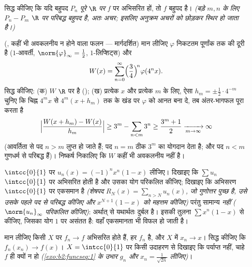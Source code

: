 \begin{exercise}[$\star\star$]\label{exo:b2:funcseq:8}
सिद्ध कीजिए कि यदि बहुपद $P_n$ \emph{पूरे $\R$ पर} $f$ पर 
अभिसरित हों, तो $f$ बहुपद है। \emph{(बड़े $m, n$ के लिए $P_n - P_m$ $\R$ पर परिबद्ध
बहुपद है, अतः अचर; इसलिए अनुक्रम अचरों को छोड़कर स्थिर हो जाता है।)}
\end{exercise}

\begin{exercise}[$\star\star\star$]\label{exo:b2:funcseq:9}
(, कहीं भी अवकलनीय न होने वाला फलन --- मार्गदर्शित) मान लीजिए $\varphi$
निकटतम पूर्णांक तक की दूरी है ($1$-आवर्ती, $\norm{\varphi}_\infty = \frac12$, $1$-लिप्शिट्स) और
\[
W(x) = \sum_{n=0}^{\infty} \Bigl(\frac{3}{4}\Bigr)^{\!n}
\varphi(4^n x) .
\]
सिद्ध कीजिए: (क) $W$ $\R$ पर  है (); (ख) प्रत्येक $x$
और प्रत्येक $m$ के लिए, ऐसा $h_m = \pm\frac12\cdot 4^{-m}$ चुनिए कि चिह्न $4^m x$ से $4^m(x + h_m)$ तक के खंड पर
$\varphi$ को आनत बना दे, तब अंतर-भागफल पूरा करता है
\[
\Bigl|\frac{W(x + h_m) - W(x)}{h_m}\Bigr| \geq 3^m -
\sum_{n<m} 3^n \geq \frac{3^m + 1}{2} \xrightarrow[m\to\infty]{}
\infty
\]
(आवर्तिता से पद $n > m$ लुप्त हो जाते हैं; पद $n = m$ ठीक $3^m$ का योगदान देता
है; और पद $n < m$  गुणधर्म से परिबद्ध हैं)। निष्कर्ष निकालिए कि
$W$ कहीं भी अवकलनीय नहीं है।
\end{exercise}

\begin{exercise}[$\star$]\label{exo:b2:funcseq:10}
$\intcc{0}{1}$ पर $u_n(x) = (-1)^n x^n(1 - x)$ लीजिए। दिखाइए कि $\sum u_n$ $\intcc{0}{1}$ पर  अभिसरित होती है और उसका
योग परिकलित कीजिए; दिखाइए कि अभिसरण $\intcc{0}{1}$ पर एकसमान है \emph{(शेषपद $R_N(x) = \sum_{n > N} u_n(x)$,
जो गुणोत्तर पुच्छ है, उसे उसके पहले पद से परिबद्ध कीजिए और $x^{N+1}(1-x)$ को महत्तम
कीजिए)} परंतु सामान्य \emph{नहीं} \emph{($\norm{u_n}_\infty$ परिकलित कीजिए)}: अर्थात्
  से यथार्थतः दुर्बल है। इसकी तुलना $\sum x^n(1-x)$ से
कीजिए, जिसका योग $1$ पर असंतत है: वहाँ एकसमानता भी विफल हो जाती है।
\end{exercise}

\begin{exercise}[$\star\star$]\label{exo:b2:funcseq:11}
मान लीजिए किसी  $X$ पर $f_n \to f$  अभिसरित होते हैं, हर
$f_n$  है, और $X$ में $x_n \to x$। सिद्ध कीजिए कि $f_n(x_n) \to
f(x)$। $X = \intcc{0}{1}$ पर किसी उदाहरण से
दिखाइए कि  पर्याप्त नहीं, चाहे $f$  ही क्यों न हो
\emph{(\cref{exo:b2:funcseq:1} के उभार $g_n$ और $x_n =
\frac{1}{\sqrt{2n}}$ लीजिए)}।
\end{exercise}

